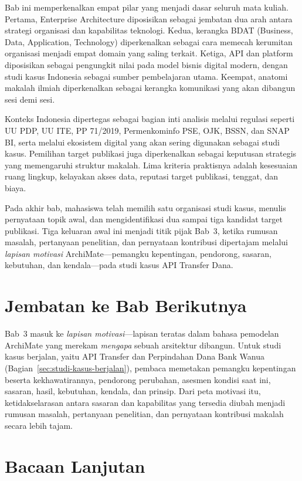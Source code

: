 Bab ini memperkenalkan empat pilar yang menjadi dasar seluruh mata kuliah.
Pertama, Enterprise Architecture diposisikan sebagai jembatan dua arah antara
strategi organisasi dan kapabilitas teknologi. Kedua, kerangka BDAT (Business,
Data, Application, Technology) diperkenalkan sebagai cara memecah kerumitan
organisasi menjadi empat domain yang saling terkait. Ketiga, API dan platform
diposisikan sebagai pengungkit nilai pada model bisnis digital modern, dengan
studi kasus Indonesia sebagai sumber pembelajaran utama. Keempat, anatomi
makalah ilmiah diperkenalkan sebagai kerangka komunikasi yang akan dibangun
sesi demi sesi.

Konteks Indonesia dipertegas sebagai bagian inti analisis melalui regulasi
seperti UU PDP, UU ITE, PP 71/2019, Permenkominfo PSE, OJK, BSSN, dan SNAP
BI, serta melalui ekosistem digital yang akan sering digunakan sebagai studi
kasus. Pemilihan target publikasi juga diperkenalkan sebagai keputusan
strategis yang memengaruhi struktur makalah. Lima kriteria praktisnya adalah
kesesuaian ruang lingkup, kelayakan akses data, reputasi target publikasi,
tenggat, dan biaya.

Pada akhir bab, mahasiswa telah memilih satu organisasi studi kasus, menulis
pernyataan topik awal, dan mengidentifikasi dua sampai tiga kandidat target
publikasi. Tiga keluaran awal ini menjadi titik pijak Bab~3, ketika rumusan
masalah, pertanyaan penelitian, dan pernyataan kontribusi dipertajam melalui
\emph{lapisan motivasi} ArchiMate---pemangku kepentingan, pendorong, sasaran,
kebutuhan, dan kendala---pada studi kasus API Transfer Dana.

\section{Jembatan ke Bab Berikutnya}

Bab~3 masuk ke \emph{lapisan motivasi}---lapisan teratas dalam bahasa pemodelan
ArchiMate yang merekam \emph{mengapa} sebuah arsitektur dibangun. Untuk studi
kasus berjalan, yaitu API Transfer dan Perpindahan Dana Bank Wanua
(Bagian~\ref{sec:studi-kasus-berjalan}), pembaca memetakan pemangku kepentingan
beserta kekhawatirannya, pendorong perubahan, asesmen kondisi saat ini, sasaran,
hasil, kebutuhan, kendala, dan prinsip. Dari peta motivasi itu, ketidakselarasan
antara sasaran dan kapabilitas yang tersedia diubah menjadi rumusan masalah,
pertanyaan penelitian, dan pernyataan kontribusi makalah secara lebih tajam.

\section{Bacaan Lanjutan}


